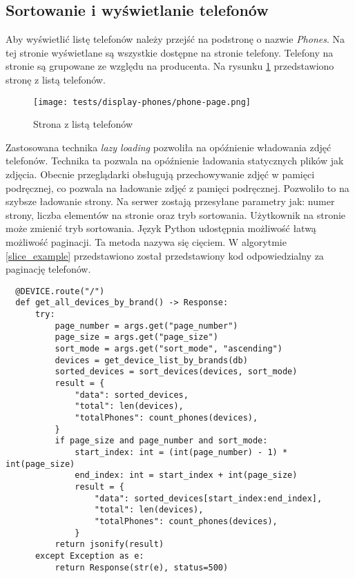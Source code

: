 \subsection{Sortowanie i wyświetlanie telefonów}
Aby wyświetlić listę telefonów należy przejść na podstronę o nazwie \textit{Phones}. Na tej stronie wyświetlane są wszystkie dostępne na stronie telefony. Telefony na stronie są grupowane ze względu na producenta. Na rysunku \ref{phones_page} przedstawiono stronę z listą telefonów.
\begin{figure}[H]
  \centering
  \texttt{[image: tests/display-phones/phone-page.png]}
  \caption{Strona z listą telefonów}
  \label{phones_page}
\end{figure}
Zastosowana technika \textit{lazy loading} pozwoliła na opóźnienie władowania zdjęć telefonów. Technika ta pozwala na opóźnienie ładowania statycznych plików jak zdjęcia. Obecnie przeglądarki obsługują przechowywanie zdjęć w pamięci podręcznej, co pozwala na ładowanie zdjęć z pamięci podręcznej. Pozwoliło to na szybsze ładowanie strony. Na serwer zostają przesyłane parametry jak: numer strony, liczba elementów na stronie oraz tryb sortowania. Użytkownik na stronie może zmienić tryb sortowania. Język Python udostępnia możliwość łatwą możliwość paginacji. Ta metoda nazywa się cięciem. W algorytmie \ref{slice_example} przedstawiono  został przedstawiony kod odpowiedzialny za paginację telefonów.
\begin{code}[H]
  \begin{verbatim}
  @DEVICE.route("/")
  def get_all_devices_by_brand() -> Response:
      try:
          page_number = args.get("page_number")
          page_size = args.get("page_size")
          sort_mode = args.get("sort_mode", "ascending")
          devices = get_device_list_by_brands(db)
          sorted_devices = sort_devices(devices, sort_mode)
          result = {
              "data": sorted_devices,
              "total": len(devices),
              "totalPhones": count_phones(devices),
          }
          if page_size and page_number and sort_mode:
              start_index: int = (int(page_number) - 1) * int(page_size)
              end_index: int = start_index + int(page_size)
              result = {
                  "data": sorted_devices[start_index:end_index],
                  "total": len(devices),
                  "totalPhones": count_phones(devices),
              }
          return jsonify(result)
      except Exception as e:
          return Response(str(e), status=500)    
  \end{verbatim}
  \centering
  \caption{Endpoint znajdujący się w aplikacji - pozwala na paginację wykonaną metodą cięcia}
  \label{slice_example}
\end{code}
